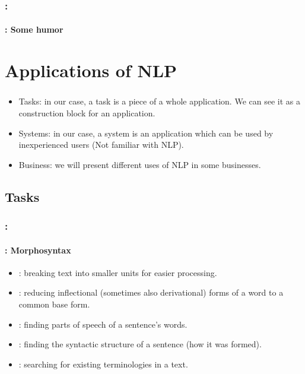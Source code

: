 \documentclass[xcolor=table]{beamer}
\begin{document}
\begin{frame}
	\frametitle{\insertshortsubtitle: \insertsection}
	\framesubtitle{\insertsubsection: Some humor}

	\begin{center}
	\end{center}

\end{frame}

\section{Applications of NLP}

\begin{frame}
	\frametitle{\insertshortsubtitle}
	\framesubtitle{\insertsection}
	
	\begin{itemize}
		\item Tasks: in our case, a task is a piece of a whole application.
		We can see it as a construction block for an application. 
		\item Systems: in our case, a system is an application which can be used by inexperienced users (Not familiar with NLP).
		\item Business: we will present different uses of NLP in some businesses.
	\end{itemize}
	
\end{frame}

\subsection{Tasks}

\begin{frame}
	\frametitle{\insertshortsubtitle: \insertsection}
	\framesubtitle{\insertsubsection: Morphosyntax}

	\begin{itemize}
		\item {}: breaking text into smaller units for easier processing.
		\item {}: reducing inflectional (sometimes also derivational) forms of a word to a common base form.
		\item {}: finding parts of speech of a sentence's words.
		\item {}: finding the syntactic structure of a sentence (how it was formed).
		\item {}: searching for existing terminologies in a text.
	\end{itemize}

\end{frame}
\end{document}
